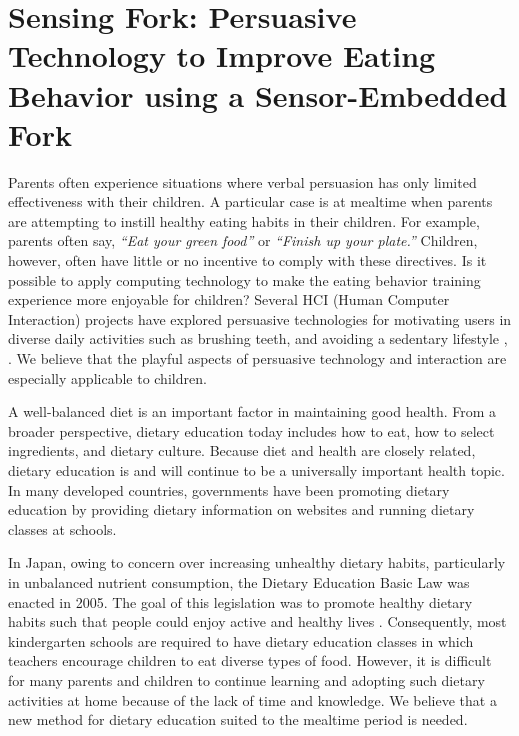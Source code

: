 \newpage
\section{Sensing Fork: Persuasive Technology to Improve Eating Behavior using a Sensor-Embedded Fork}

Parents often experience situations where verbal persuasion 
has only limited effectiveness with their children. 
A particular case is at mealtime when parents are attempting 
to instill healthy eating habits in their children. 
For example, parents often say, \textit{``Eat your green food''} 
or \textit{``Finish up your plate.''} 
Children, however, often have little or no incentive to comply with these directives. 
Is it possible to apply computing technology to make the eating behavior training experience 
more enjoyable for children? 
Several HCI (Human Computer Interaction) projects have explored 
persuasive technologies \cite{Fogg:2002} for motivating users in diverse daily activities 
such as brushing teeth, and avoiding a sedentary lifestyle \cite{Chang:2008}, \cite{Lin:2006}. 
We believe that the playful aspects of persuasive technology and interaction 
are especially applicable to children.

A well-balanced diet is an important factor in maintaining good health. 
From a broader perspective, dietary education today includes how to eat, 
how to select ingredients, and dietary culture. 
Because diet and health are closely related, dietary education 
is and will continue to be a universally important health topic. 
In many developed countries, governments have been promoting dietary education 
by providing dietary information on websites \cite{NHS_ENGLAND, US_Agriculture} and running dietary classes at schools.

In Japan, owing to concern over increasing unhealthy dietary habits, particularly in unbalanced nutrient consumption, 
the Dietary Education Basic Law was enacted in 2005. 
The goal of this legislation was to promote healthy dietary habits 
such that people could enjoy active 
and healthy lives \cite{Cabinet_JP}. 
Consequently, most kindergarten schools are required to have dietary education classes 
in which teachers encourage children to eat diverse types of food. 
However, it is difficult for many parents and children to continue learning 
and adopting such dietary activities at home because of the lack of time and knowledge. 
We believe that a new method for dietary education suited to the mealtime period is needed.

